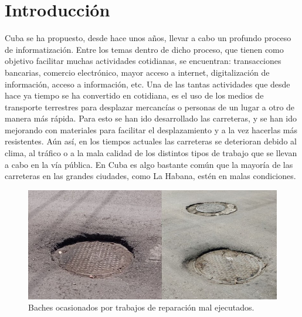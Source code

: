 \chapter*{Introducción}\label{chapter:introduction}

Cuba se ha propuesto, desde hace unos años, llevar a cabo un profundo proceso de informatización.
Entre los temas dentro de dicho proceso, que tienen como objetivo facilitar muchas actividades
cotidianas, se encuentran: transacciones bancarias, comercio electrónico, mayor acceso a internet, digitalización
de información, acceso a información, etc. Una de las tantas actividades que desde hace ya tiempo se ha convertido en
cotidiana, es el uso de los medios de transporte terrestres para desplazar mercancías o personas de un lugar a otro de
manera más rápida. Para esto se han ido desarrollado las carreteras, y se han ido mejorando con materiales para facilitar
el desplazamiento y a la vez hacerlas más resistentes. Aún así, en los tiempos actuales las carreteras se deterioran
debido al clima, al tráfico o a la mala calidad de los distintos tipos de trabajo que se llevan a cabo en la vía
pública. En Cuba es algo bastante común que la mayoría de las carreteras en las grandes ciudades, como La Habana,
estén en malas condiciones.\\

\begin{figure}[htb]
	\centering
	\includegraphics[scale=0.45]{Graphics/pothole_due_to_bad_job_1}
	\caption{Baches ocasionados por trabajos de reparación mal ejecutados.}
	\label{fig:1}
\end{figure}
	
